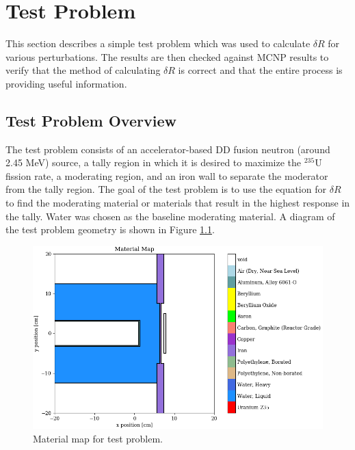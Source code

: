 \chapter{Test Problem}
\label{chap:testprob}

This section describes a simple test problem which was used to calculate $\delta R$ for various perturbations.
The results are then checked against MCNP results to verify that the method of calculating $\delta R$ is correct and that the entire process is providing useful information.

\section{Test Problem Overview}
\label{sec:bg:tp:overview}

The test problem consists of an accelerator-based DD fusion neutron (around 2.45 MeV) source, a tally region in which it is desired to maximize the ${}^{235}\text{U}$ fission rate, a moderating region, and an iron wall to separate the moderator from the tally region.
The goal of the test problem is to use the equation for $\delta R$ to find the moderating material or materials that result in the highest response in the tally.
Water was chosen as the baseline moderating material.
A diagram of the test problem geometry is shown in Figure \ref{fig:testprob:material_map}.

\begin{figure}[h!]
  \centering
  \includegraphics[width=\linewidth]{content/testprob/material_map.png}
  \caption{Material map for test problem.}
  \label{fig:testprob:material_map}
\end{figure}

